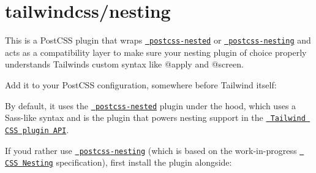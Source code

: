\chapter{tailwindcss/nesting}
\hypertarget{md_node__modules_2tailwindcss_2lib_2postcss-plugins_2nesting_2README}{}\label{md_node__modules_2tailwindcss_2lib_2postcss-plugins_2nesting_2README}
\label{md_node__modules_2tailwindcss_2lib_2postcss-plugins_2nesting_2README_autotoc_md27890}%
%
 This is a Post\+CSS plugin that wraps \href{https://github.com/postcss/postcss-nested}{\texttt{ postcss-\/nested}} or \href{https://github.com/csstools/postcss-plugins/tree/main/plugins/postcss-nesting}{\texttt{ postcss-\/nesting}} and acts as a compatibility layer to make sure your nesting plugin of choice properly understands Tailwind\textquotesingle{}s custom syntax like {\ttfamily @apply} and {\ttfamily @screen}.

Add it to your Post\+CSS configuration, somewhere before Tailwind itself\+:


\begin{DoxyCode}{0}
\DoxyCodeLine{\ \ plugins:\ [}
\DoxyCodeLine{\ \ ]}
\DoxyCodeLine{\}}

\end{DoxyCode}


By default, it uses the \href{https://github.com/postcss/postcss-nested}{\texttt{ postcss-\/nested}} plugin under the hood, which uses a Sass-\/like syntax and is the plugin that powers nesting support in the \href{https://tailwindcss.com/docs/plugins\#css-in-js-syntax}{\texttt{ Tailwind CSS plugin API}}.

If you\textquotesingle{}d rather use \href{https://github.com/csstools/postcss-plugins/tree/main/plugins/postcss-nesting}{\texttt{ postcss-\/nesting}} (which is based on the work-\/in-\/progress \href{https://drafts.csswg.org/css-nesting-1/}{\texttt{ CSS Nesting}} specification), first install the plugin alongside\+:


\begin{DoxyCode}{0}

\end{DoxyCode}



